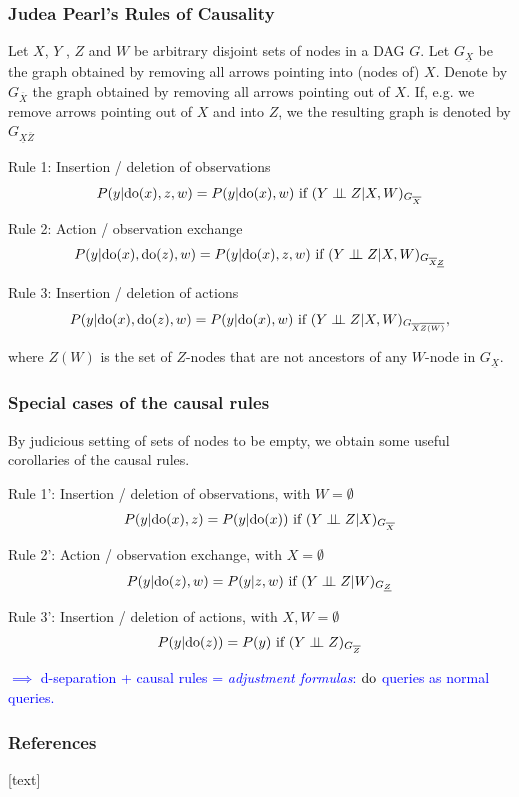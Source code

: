\begin{frame}
\frametitle{Judea Pearl's Rules of Causality}

Let $X$, $Y$ , $Z$ and $W$ be arbitrary disjoint sets of nodes in a DAG $G$. Let $G_\underline{X}$ be the graph obtained by removing all arrows pointing into (nodes of) $X$. 
Denote by $G_{\overline{X}}$ the graph obtained by removing all arrows pointing out of $X$. If, e.g. we remove arrows pointing out of $X$ and into $Z$, we the resulting graph is denoted by $G_{\underline{X} \overline{Z}}$

Rule 1: Insertion / deletion of observations
\begin{equation*}
P(y | \mathrm{do}(x), z, w) = P(y | \mathrm{do}(x), w) \textrm{ if } (Y \perp\!\!\!\perp Z | X, W)_{G_{\overline{X}}}
\end{equation*}

Rule 2: Action / observation exchange
\begin{equation*}
P(y | \mathrm{do}(x), \mathrm{do}(z), w) = P(y | \mathrm{do}(x), z, w) \textrm{ if } (Y \perp\!\!\!\perp Z | X, W)_{G_{\overline{X} \underline{Z}}}
\end{equation*}

Rule 3: Insertion / deletion of actions
\begin{equation*}
P(y | \mathrm{do}(x), \mathrm{do}(z), w) = P(y | \mathrm{do}(x), w) \textrm{ if } (Y \perp\!\!\!\perp Z | X, W)_{G_{\overline{X} \overline{Z(W)}}},
\end{equation*}

where $Z(W)$ is the set of $Z$-nodes that are not ancestors of any $W$-node in $G_\underline{X}$.

\end{frame}


\begin{frame}
\frametitle{Special cases of the causal rules}

By judicious setting of sets of nodes to be empty, we obtain some useful corollaries of the causal rules.
\newline

Rule 1': Insertion / deletion of observations, with $W = \emptyset$
\begin{equation*}
    P(y | \mathrm{do}(x), z) = P(y | \mathrm{do}(x)) \textrm{ if } (Y \perp\!\!\!\perp Z | X)_{G_{\overline{X}}}
\end{equation*}

Rule 2': Action / observation exchange, with $X = \emptyset$
\begin{equation*}
P(y | \mathrm{do}(z), w) = P(y | z, w) \textrm{ if } (Y \perp\!\!\!\perp Z | W)_{G_{ \underline{Z}}}
\end{equation*}

Rule 3': Insertion / deletion of actions, with $X, W = \emptyset$
\begin{equation*}
P(y | \mathrm{do}(z)) = P(y) \textrm{ if } (Y \perp\!\!\!\perp Z )_{G_{\overline{Z}}}
\end{equation*}

\textcolor{blue}{$\implies$ d-separation + causal rules = \emph{adjustment formulas}: $\mathrm{do}$ queries as normal queries.}
\end{frame}


\begin{frame}[allowframebreaks]
    \frametitle{References}
    [text]
    
    
\end{frame}


